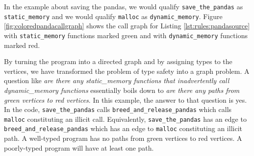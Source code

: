 In the example about saving the pandas, we would qualify \lstinline{save_the_pandas} as \lstinline{static_memory} and we would qualify \lstinline{malloc} as \lstinline{dynamic_memory}.  Figure \ref{fig:coloredpandacallgraph} shows the call graph for Listing \ref{lst:rules:pandasource} with \lstinline{static_memory} functions marked green and with \lstinline{dynamic_memory} functions marked red.



\begin{sloppypar}
By turning the program into a directed graph and by assigning types to the vertices, we have transformed the problem of type safety into a graph problem.  A question like \textit{are there any static\_memory functions that inadvertently call dynamic\_memory functions} essentially boils down to \textit{are there any paths from green vertices to red vertices}.  In this example, the answer to that question is yes.  In the code, \lstinline{save_the_pandas} calls \lstinline{breed_and_release_pandas} which calls \lstinline{malloc} constituting an illicit call.  Equivalently, \lstinline{save_the_pandas} has an edge to \lstinline{breed_and_release_pandas} which has an edge to \lstinline{malloc} constituting an illicit path.  A well-typed program has no paths from green vertices to red vertices.  A poorly-typed program will have at least one path.  
\end{sloppypar}


